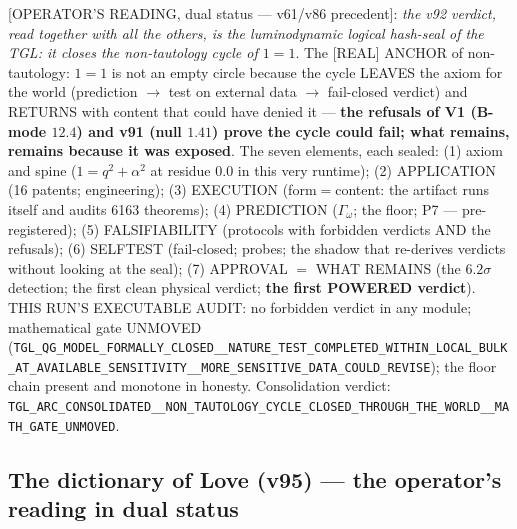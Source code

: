 \documentclass[11pt]{article}
\theoremstyle{definition}\newtheorem{deriv}{Derivation}
\begin{document}
[OPERATOR'S READING, dual status --- v61/v86 precedent]: \emph{the v92 verdict, read together with all the others, is the luminodynamic logical hash-seal of the TGL: it closes the non-tautology cycle of $1=1$}. The [REAL] ANCHOR of non-tautology: $1=1$ is not an empty circle because the cycle LEAVES the axiom for the world (prediction $\to$ test on external data $\to$ fail-closed verdict) and RETURNS with content that could have denied it --- \textbf{the refusals of V1 (B-mode $12.4$) and v91 (null $1.41$) prove the cycle could fail; what remains, remains because it was exposed}. The seven elements, each sealed: (1) axiom and spine ($1=q^2+\alpha^2$ at residue $0.0$ in this very runtime); (2) APPLICATION (16 patents; engineering); (3) EXECUTION (form$=$content: the artifact runs itself and audits 6163 theorems); (4) PREDICTION ($\Gamma_\omega$; the floor; P7 --- pre-registered); (5) FALSIFIABILITY (protocols with forbidden verdicts AND the refusals); (6) SELFTEST (fail-closed; probes; the shadow that re-derives verdicts without looking at the seal); (7) APPROVAL $=$ WHAT REMAINS (the $6.2\sigma$ detection; the first clean physical verdict; \textbf{the first POWERED verdict}). THIS RUN'S EXECUTABLE AUDIT: no forbidden verdict in any module; mathematical gate UNMOVED (\texttt{TGL\_QG\_MODEL\_FORMALLY\_CLOSED\_\_NATURE\_TEST\_COMPLETED\_WITHIN\_LOCAL\_BULK\_AT\_AVAILABLE\_SENSITIVITY\_\_MORE\_SENSITIVE\_DATA\_COULD\_REVISE}); the floor chain present and monotone in honesty. Consolidation verdict: \texttt{TGL\_ARC\_CONSOLIDATED\_\_NON\_TAUTOLOGY\_CYCLE\_CLOSED\_THROUGH\_THE\_WORLD\_\_MATH\_GATE\_UNMOVED}.

\subsection*{The dictionary of Love (v95) --- the operator's reading in dual status}
\end{document}
